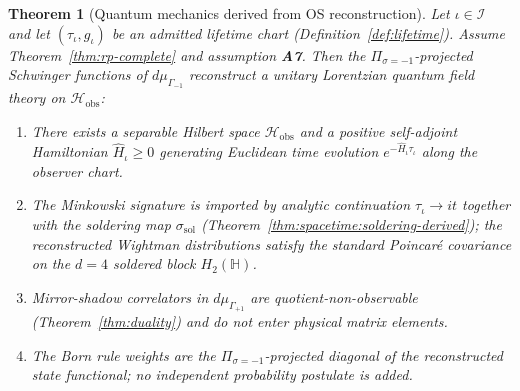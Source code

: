 \documentclass[aps,prd,onecolumn,amsmath,amssymb,nofootinbib,11pt]{revtex4-2}
\numberwithin{equation}{section}
\theoremstyle{plain}
\newtheorem{theorem}{Theorem}[section]
\theoremstyle{definition}
\theoremstyle{remark}
\newcommand{\Quat}{\mathbb{H}}
\begin{document}
\begin{theorem}[Quantum mechanics derived from OS reconstruction]
\label{thm:qm-derived}
Let $\iota\in\mathcal{I}$ and let $(\tau_\iota,g_\iota)$ be an admitted lifetime
chart (Definition~\ref{def:lifetime}). Assume Theorem~\ref{thm:rp-complete} and
assumption \textbf{A7}. Then the $\Pi_{\sigma=-1}$-projected Schwinger
functions of $d\mu_{\Gamma_{-1}}$ reconstruct a unitary Lorentzian quantum
field theory on $\mathcal{H}_{\mathrm{obs}}$:
\begin{enumerate}[label=(\roman*),leftmargin=*]
  \item There exists a separable Hilbert space $\mathcal{H}_{\mathrm{obs}}$ and
    a positive self-adjoint Hamiltonian $\hat H_\iota\ge 0$ generating
    Euclidean time evolution $e^{-\hat H_\iota\tau_\iota}$ along the observer
    chart.
  \item The Minkowski signature is imported by analytic continuation
    $\tau_\iota\to i t$ together with the soldering map
    $\sigma_{\mathrm{sol}}$ (Theorem~\ref{thm:spacetime:soldering-derived});
    the reconstructed Wightman distributions satisfy the standard
    Poincar\'e covariance on the $d=4$ soldered block $H_2(\Quat)$.
  \item Mirror-shadow correlators in $d\mu_{\Gamma_{+1}}$ are
    quotient-non-observable (Theorem~\ref{thm:duality}) and do not enter
    physical matrix elements.
  \item The Born rule weights are the $\Pi_{\sigma=-1}$-projected diagonal of
    the reconstructed state functional; no independent probability postulate is
    added.
\end{enumerate}
\end{theorem}
\end{document}
